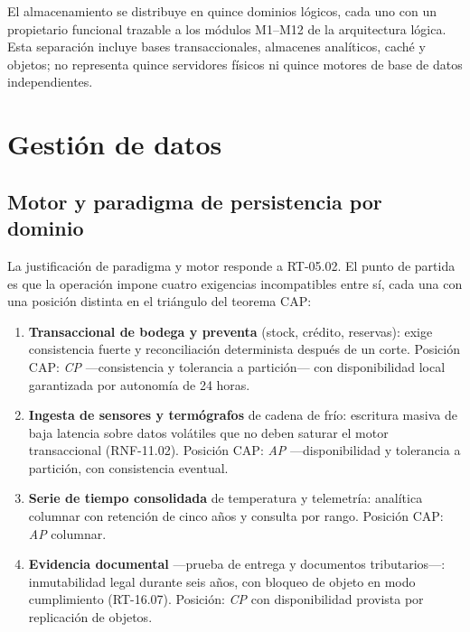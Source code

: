 El almacenamiento se distribuye en quince dominios lógicos, cada uno con un
propietario funcional trazable a los módulos M1--M12 de la arquitectura
lógica.  Esta separación incluye bases transaccionales, almacenes analíticos,
caché y objetos; no representa quince servidores físicos ni quince motores de
base de datos independientes.


\section{Gestión de datos}
\label{sec:gestion-datos}

\subsection{Motor y paradigma de persistencia por dominio}
\label{sec:motor-paradigma}

La justificación de paradigma y motor responde a RT-05.02.  El punto de
partida es que la operación impone cuatro exigencias incompatibles entre sí,
cada una con una posición distinta en el triángulo del teorema CAP:

\begin{enumerate}
\item \textbf{Transaccional de bodega y preventa} (stock, crédito, reservas):
  exige consistencia fuerte y reconciliación determinista después de un corte.
  Posición CAP: \emph{CP} ---consistencia y tolerancia a partición--- con
  disponibilidad local garantizada por autonomía de 24 horas.

\item \textbf{Ingesta de sensores y termógrafos} de cadena de frío: escritura
  masiva de baja latencia sobre datos volátiles que no deben saturar el motor
  transaccional (RNF-11.02).  Posición CAP: \emph{AP} ---disponibilidad y
  tolerancia a partición, con consistencia eventual.

\item \textbf{Serie de tiempo consolidada} de temperatura y telemetría:
  analítica columnar con retención de cinco años y consulta por rango.
  Posición CAP: \emph{AP} columnar.

\item \textbf{Evidencia documental} ---prueba de entrega y documentos
  tributarios---: inmutabilidad legal durante seis años, con bloqueo de objeto
  en modo cumplimiento (RT-16.07).  Posición: \emph{CP} con disponibilidad
  provista por replicación de objetos.
\end{enumerate}

